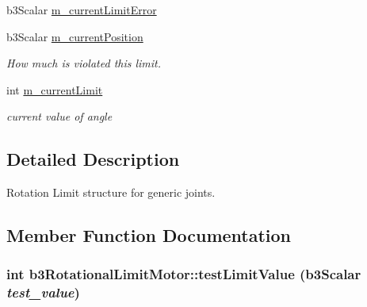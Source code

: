 \begin{Indent}{\bf }\par
\begin{CompactItemize}
\item 
b3Scalar \hyperlink{classb3_rotational_limit_motor_63167fcd92370cd81b058b9013aa2342}{m\_\-currentLimitError}
\item 
\hypertarget{classb3_rotational_limit_motor_335bfaa66cbcd0c059e7db31455bea17}{
b3Scalar \hyperlink{classb3_rotational_limit_motor_335bfaa66cbcd0c059e7db31455bea17}{m\_\-currentPosition}}
\label{classb3_rotational_limit_motor_335bfaa66cbcd0c059e7db31455bea17}

\begin{CompactList}\small\item\em How much is violated this limit. \item\end{CompactList}\item 
int \hyperlink{classb3_rotational_limit_motor_04210dff8941deee039e6c290a50f301}{m\_\-currentLimit}
\begin{CompactList}\small\item\em current value of angle \item\end{CompactList}\end{CompactItemize}
\end{Indent}


\subsection{Detailed Description}
Rotation Limit structure for generic joints. 

\subsection{Member Function Documentation}
\hypertarget{classb3_rotational_limit_motor_27246819c09d6029fb7f7c2f506ac9fd}{
\subsubsection[testLimitValue]{\setlength{\rightskip}{0pt plus 5cm}int b3RotationalLimitMotor::testLimitValue (b3Scalar {\em test\_\-value})}}
\label{classb3_rotational_limit_motor_27246819c09d6029fb7f7c2f506ac9fd}


